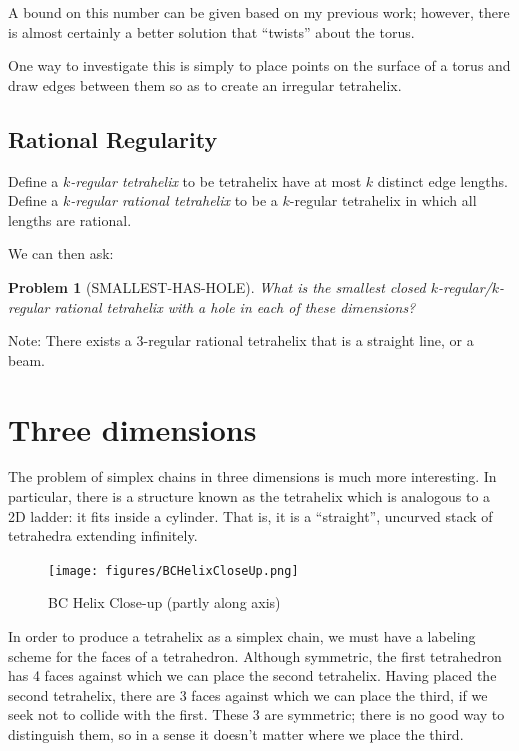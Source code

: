 \documentclass[11pt]{article}
\newtheorem{problem}{Problem}
\begin{document}
A bound on this number can be given based on my previous work; however, there is almost certainly a better solution that ``twists'' about the torus.

One way to investigate this is simply to place points on the surface of a torus and draw edges between them so as to create an irregular tetrahelix.

\subsection{Rational Regularity}

Define a {\em $k$-regular tetrahelix} to be tetrahelix have at most $k$ distinct edge lengths.
Define a {\em $k$-regular rational tetrahelix} to be a $k$-regular tetrahelix in which all lengths are rational.

We can then ask:

\begin{problem}[SMALLEST-HAS-HOLE]
  What is the smallest closed $k$-regular/$k$-regular rational tetrahelix with a hole in each of these dimensions?
\end{problem}

Note: There exists a 3-regular rational tetrahelix that is a straight line, or a beam.


\section{Three dimensions}

The problem of simplex chains in three dimensions is much more interesting. In particular, there is a structure known as the
tetrahelix which is analogous to a 2D ladder: it fits inside a cylinder. That is, it is a ``straight'', uncurved stack
of tetrahedra extending infinitely.


\begin{figure}
  \centering
     \texttt{[image: figures/BCHelixCloseUp.png]}
     \caption{BC Helix Close-up (partly along axis)}
  \label{fig:closeup}     
\end{figure}



In order to produce a tetrahelix as a simplex chain, we must have a labeling scheme for the faces of a tetrahedron.
Although symmetric, the first tetrahedron has 4 faces against which we can place the second tetrahelix.
Having placed the second tetrahelix, there are 3 faces against which we can place the third, if we
seek not to collide with the first. These 3 are symmetric; there is no good way to distinguish them,
so in a sense it doesn't matter where we place the third.
\end{document}
